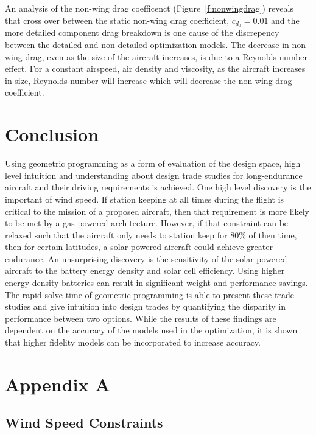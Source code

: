 \documentclass[]{aiaa-tc}%
\begin{document}
An analysis of the non-wing drag coefficenct (Figure~\ref{f:nonwingdrag}) reveals that cross over between the static non-wing drag coefficient, $c_{d_0}=0.01$ and the more detailed component drag breakdown is one cause of the discrepency between the detailed and non-detailed optimization models. 
The decrease in non-wing drag, even as the size of the aircraft increases, is due to a Reynolds number effect.  
For a constant airspeed, air density and viscosity, as the aircraft increases in size, Reynolds number will increase which will decrease the non-wing drag coefficient.



\section{Conclusion}

Using geometric programming as a form of evaluation of the design space, high level intuition and understanding about design trade studies for long-endurance aircraft and their driving requirements is achieved.  
One high level discovery is the important of wind speed.  
If station keeping at all times during the flight is critical to the mission of a proposed aircraft, then that requirement is more likely to be met by a gas-powered architecture.
However, if that constraint can be relaxed such that the aircraft only needs to station keep for 80\% of then time, then for certain latitudes, a solar powered aircraft could achieve greater endurance.
An unsurprising discovery is the sensitivity of the solar-powered aircraft to the battery energy density and solar cell efficiency.  Using higher energy density batteries can result in significant weight and performance savings.  
The rapid solve time of geometric programming is able to present these trade studies and give intuition into design trades by quantifying the disparity in performance between two options.
While the results of these findings are dependent on the accuracy of the models used in the optimization, it is shown that higher fidelity models can be incorporated to increase accuracy.





\section*{Appendix A}

\subsection{Wind Speed Constraints}
\end{document}
